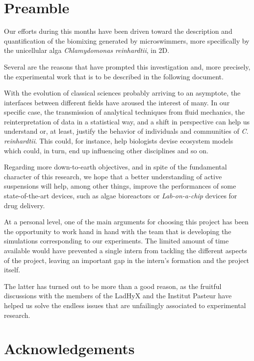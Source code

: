 \chapter*{Preamble}
\thispagestyle{empty}
Our efforts during this months have been driven toward the description and quantification of the biomixing generated by microswimmers, more specifically by the unicellular alga \textit{Chlamydomonas reinhardtii}, in 2D.

Several are the reasons that have prompted this investigation and, more precisely, the experimental work that is to be described in the following document.

With the evolution of classical sciences probably arriving to an asymptote, the interfaces between different fields have aroused the interest of many. In our specific case, the transmission of analytical techniques from fluid mechanics, the reinterpretation of data in a statistical way, and a shift in perspective can help us understand or, at least, justify the behavior of individuals and communities of \textit{C. reinhardtii}. This could, for instance, help biologists devise ecosystem models which could, in turn, end up influencing other disciplines and so on.

Regarding more down-to-earth objectives, and in spite of the fundamental character of this research, we hope that a better understanding of active suspensions will help, among other things, improve the performances of some state-of-the-art devices, such as algae bioreactors or \textit{Lab-on-a-chip} devices for drug delivery.

At a personal level, one of the main arguments for choosing this project has been the opportunity to work hand in hand with the team that is developing the simulations corresponding to our experiments. The limited amount of time available would have prevented a single intern from tackling the different aspects of the project, leaving an important gap in the intern's formation and the project itself.

The latter has turned out to be more than a good reason, as the fruitful discussions with the members of the LadHyX and the Institut Pasteur have helped us solve the endless issues that are unfailingly associated to experimental research.

\cleardoublepage %

\chapter*{Acknowledgements}

